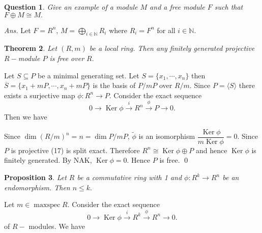 \documentclass[11pt]{amsart}
\newtheorem{theorem}{Theorem}[section]
\newtheorem{qns}[theorem]{Question}
\newtheorem{prop}[theorem]{Proposition}
\newcommand{\NN}{\mathbb N}
\newcommand\isom{\mathrel{\stackon[-0.1ex]{\makebox*{\scalebox{1.08}{\AC}}{=\hfill\llap{=}}}{{\AC}}}}
\newcommand\nvisom{\rotatebox[origin=cc] {-90}{$ \isom $}}
\newcommand{\gen}[1]{\langle#1\rangle}
\DeclareMathOperator{\Ker}{\text{Ker}}
\DeclareMathOperator{\mspec}{\text{maxspec}}
\begin{document}
\begin{qns}

Give an example of a module $M$ and a free module $F$ such that $F\oplus M\cong M.$

\end{qns}

\textit{Ans.} Let $F=R^n$, $M=\displaystyle\bigoplus_{i\in{\NN}} R_i$ where $R_i=F^n$ for all $i\in{\NN}.$

\begin{theorem}

Let $(R,m)$ be a local ring. Then any finitely generated projective $R-$module $P$ is free over $R.$

\end{theorem}

\proof Let $S\subseteq P$ be a minimal generating set. Let $S=\{x_1,\cdots,x_n\}$ then $\overline{S}=\{x_1+mP,\cdots,x_n+mP\}$ is the basis of $P/mP$ over $R/m.$ Since $P=\gen{S}$ there exists a surjective map $\phi:R^n\to P$. Consider the exact sequence \begin{equation}
0\to \Ker \phi\xrightarrow{i} R^n\xrightarrow{\phi}P\to 0.
\end{equation} Then we have 

\begin{center}


\end{center}

Since $\dim (R/m)^n=n=\dim P/mP$, $\tilde{\phi}$ is an isomorphism $\dfrac{\Ker \phi}{m\Ker \phi}=0.$ Since $P$ is projective (17) is split exact. Therefore $R^n\cong \Ker \phi\oplus P$ and hence $\Ker \phi$ is finitely generated. By NAK, $\Ker\phi=0$. Hence $P$ is free. \qed

\begin{prop}

Let $R$ be a commutative ring with 1 and $\phi:R^k\to R^n$ be an endomorphism. Then $n\leq k.$

\end{prop}

\proof Let $m\in\mspec R.$ Consider the exact sequence \begin{equation}
0\to \Ker\phi\xrightarrow{i} R^k\xrightarrow{\phi} R^n\to 0.
\end{equation}
of $R-$ modules. We have 
\end{document}
